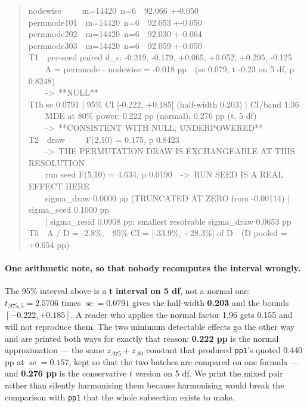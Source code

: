 \documentclass[10pt,letterpaper]{article}
\newcommand{\arm}[1]{\texttt{#1}}
\DeclareMathOperator{\se}{se}
\begin{document}
\begin{quote}\small\ttfamily
nodewise\ \ \ \ \ m=14420\ n=6\ \ 92.066 +-0.050\\
permnode101\ \ m=14420\ n=6\ \ 92.053 +-0.050\\
permnode202\ \ m=14420\ n=6\ \ 92.030 +-0.064\\
permnode303\ \ m=14420\ n=6\ \ 92.059 +-0.050\\[2pt]
T1\ \ per-seed paired d\_s: -0.219, -0.179, +0.065, +0.052, +0.295, -0.125\\
\ \ \ \ A = permnode - nodewise = -0.018 pp\ \ (se 0.079, t -0.23 on 5 df, p 0.8248)\\
\ \ \ \ ->\ **NULL**\\
T1b se 0.0791 | 95\% CI [-0.222, +0.185] (half-width 0.203) | CI/band 1.36\\
\ \ \ \ MDE at 80\% power: 0.222 pp (normal), 0.276 pp (t, 5 df)\\
\ \ \ \ ->\ **CONSISTENT WITH NULL, UNDERPOWERED**\\
T2\ \ draw\ \ \ \ \ F(2,10) = 0.175, p 0.8423\\
\ \ \ \ ->\ THE PERMUTATION DRAW IS EXCHANGEABLE AT THIS RESOLUTION\\
\ \ \ \ run seed F(5,10) = 4.634, p 0.0190\ \ ->\ RUN SEED IS A REAL EFFECT HERE\\
\ \ \ \ sigma\_draw 0.0000 pp (TRUNCATED AT ZERO from -0.00114) | sigma\_seed 0.1000 pp\\
\ \ \ \ | sigma\_resid 0.0908 pp; smallest resolvable sigma\_draw 0.0653 pp\\
T5\ \ A / D = -2.8\%;\ \ 95\% CI = [-33.9\%, +28.3\%] of D\ \ (D pooled = +0.654 pp)
\end{quote}

\paragraph{One arithmetic note, so that nobody recomputes the interval wrongly.}
The 95\% interval above is a $\mathbf{t}$ \textbf{interval on 5 df}, not a normal one:
$t_{.975,5} = 2.5706$ times $\se = 0.0791$ gives the half-width \textbf{0.203} and the bounds
$[-0.222, +0.185]$. A reader who applies the normal factor 1.96 gets 0.155 and will not reproduce
them. The two minimum detectable effects go the other way and are printed both ways for exactly
that reason: \textbf{0.222 pp} is the normal approximation --- the same $z_{.975} + z_{.80}$
constant that produced \arm{pp1}'s quoted 0.440 pp at $\se = 0.157$, kept so that the two batches
are compared on one formula --- and \textbf{0.276 pp} is the conservative $t$ version on 5 df. We
print the mixed pair rather than silently harmonising them because harmonising would break the
comparison with \arm{pp1} that the whole subsection exists to make.
\end{document}
